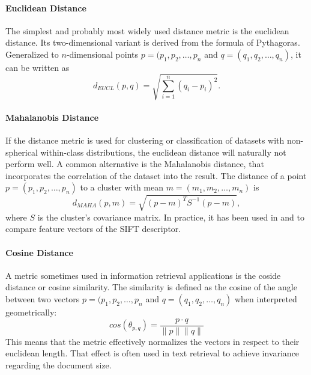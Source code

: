 \paragraph{Euclidean Distance}\label{sec:anatomy_ranking_distance_euclidean}

The simplest and probably most widely used distance metric is the euclidean
distance. Its two-dimensional variant is derived from the formula of
Pythagoras. Generalized to $n$-dimensional points $p = (p_1, p_2, \dots, p_n$
and $q = (q_1, q_2, \dots, q_n)$, it can be written as
\begin{equation*}
    d_{EUCL}(p, q) = \sqrt{\sum_{i=1}^n (q_i - p_i)^2}.
\end{equation*}

\paragraph{Mahalanobis Distance}

If the distance metric is used for clustering or classification of datasets
with non-spherical within-class distributions, the euclidean distance will
naturally not perform well. A common alternative is the Mahalanobis distance,
that incorporates the correlation of the dataset into the result. The distance
of a point $p = (p_1, p_2, \dots, p_n)$ to a cluster with mean $m = (m_1, m_2,
\dots, m_n)$ is
\begin{equation*}
    d_{MAHA}(p, m) = \sqrt{(p - m)^T S^{-1} (p - m)},
\end{equation*}
where $S$ is the cluster's covariance matrix. In practice, it has been used in
\autocite{mikolajczyk_scale_2004} and \autocite{sivic_video_2003} to compare
feature vectors of the SIFT \autocite{lowe_object_1999} descriptor.

\paragraph{Cosine Distance}

A metric sometimes used in information retrieval applications is the coside
distance or cosine similarity. The similarity is defined as the cosine of the
angle between two vectors $p = (p_1, p_2, \dots, p_n$ and $q = (q_1, q_2,
\dots, q_n)$ when interpreted geometrically:
\begin{equation*}
    cos(\theta_{p, q}) = \frac{p \cdot q}{\|p\| \|q\|}
\end{equation*}
This means that the metric effectively normalizes the vectors in respect to
their euclidean length. That effect is often used in text retrieval to achieve
invariance regarding the document size.

